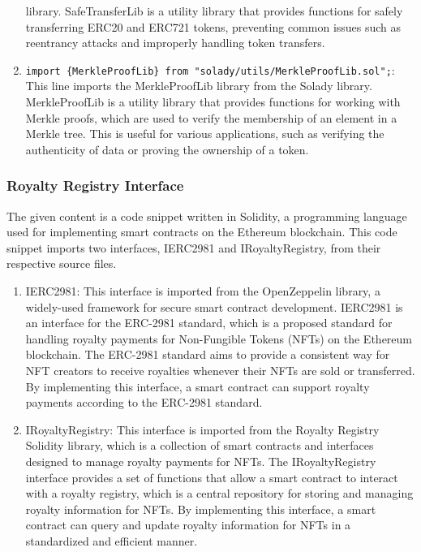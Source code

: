 \begin{enumerate}
  library. SafeTransferLib is a utility library that provides functions
  for safely transferring ERC20 and ERC721 tokens, preventing common
  issues such as reentrancy attacks and improperly handling token
  transfers.
\item
  \texttt{import\ \{MerkleProofLib\}\ from\ "solady/utils/MerkleProofLib.sol";}:
  This line imports the MerkleProofLib library from the Solady library.
  MerkleProofLib is a utility library that provides functions for
  working with Merkle proofs, which are used to verify the membership of
  an element in a Merkle tree. This is useful for various applications,
  such as verifying the authenticity of data or proving the ownership of
  a token.
\end{enumerate}

\hypertarget{royalty-registry-interface}{%
\subsubsection{Royalty Registry
Interface}\label{royalty-registry-interface}}

The given content is a code snippet written in Solidity, a programming
language used for implementing smart contracts on the Ethereum
blockchain. This code snippet imports two interfaces, IERC2981 and
IRoyaltyRegistry, from their respective source files.

\begin{enumerate}
\def\labelenumi{\arabic{enumi}.}
\item
  IERC2981: This interface is imported from the OpenZeppelin library, a
  widely-used framework for secure smart contract development. IERC2981
  is an interface for the ERC-2981 standard, which is a proposed
  standard for handling royalty payments for Non-Fungible Tokens (NFTs)
  on the Ethereum blockchain. The ERC-2981 standard aims to provide a
  consistent way for NFT creators to receive royalties whenever their
  NFTs are sold or transferred. By implementing this interface, a smart
  contract can support royalty payments according to the ERC-2981
  standard.
\item
  IRoyaltyRegistry: This interface is imported from the Royalty Registry
  Solidity library, which is a collection of smart contracts and
  interfaces designed to manage royalty payments for NFTs. The
  IRoyaltyRegistry interface provides a set of functions that allow a
  smart contract to interact with a royalty registry, which is a central
  repository for storing and managing royalty information for NFTs. By
  implementing this interface, a smart contract can query and update
  royalty information for NFTs in a standardized and efficient manner.
\end{enumerate}

